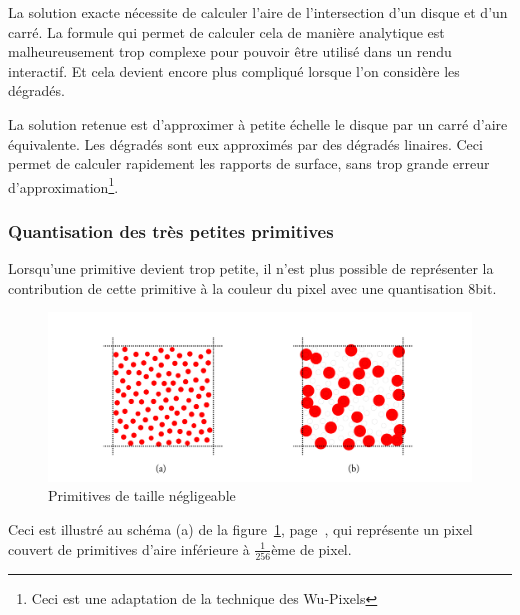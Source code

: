 			La solution exacte nécessite de calculer l'aire de l'intersection d'un disque et d'un carré. 
			La formule qui permet de calculer cela de manière analytique est malheureusement trop complexe pour
			pouvoir être utilisé dans un rendu interactif. Et cela devient encore plus compliqué lorsque 
			l'on considère les dégradés.

			La solution retenue est d'approximer à petite échelle le disque par un carré d'aire équivalente.
			Les dégradés sont eux approximés par des dégradés linaires. Ceci permet de calculer rapidement les
			rapports de surface, sans trop grande erreur d'approximation\footnote{Ceci est une adaptation de la technique des Wu-Pixels\cite{wupixel}}.

		\subsubsection{Quantisation des très petites primitives }
			Lorsqu'une primitive devient trop petite, il n'est plus possible de 
			représenter la contribution de cette primitive à la couleur du pixel avec une quantisation 8bit. 
				\begin{figure}[ht]
					\centering
					\includegraphics[width=\textwidth]{images/petites-primitives} 
					\caption{Primitives de taille négligeable}
					\label{fig:petit}
				\end{figure}
			Ceci est illustré au schéma (a) de la figure~\ref{fig:petit}, page~\pageref{fig:petit}, qui
			représente un pixel couvert de primitives d'aire inférieure à $\frac{1}{256}$ème de pixel.


